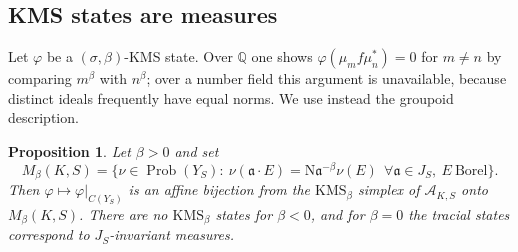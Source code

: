 \documentclass[11pt]{amsart}
\numberwithin{equation}{section}
\newtheorem{proposition}[theorem]{Proposition}
\theoremstyle{definition}
\theoremstyle{remark}
\newcommand{\Q}{\mathbb{Q}}
\newcommand{\Prob}{\operatorname{Prob}}
\newcommand{\Ns}{\mathrm{N}}
\newcommand{\cA}{\mathcal{A}}
\newcommand{\aaa}{\mathfrak{a}}
\begin{document}
\subsection{KMS states are measures}

Let $\varphi$ be a $(\sigma,\beta)$-KMS state. Over $\Q$ one shows
$\varphi(\mu_mf\mu_n^*)=0$ for $m\neq n$ by comparing $m^\beta$ with $n^\beta$;
over a number field this argument is unavailable, because distinct ideals
frequently have equal norms. We use instead the groupoid description.

\begin{proposition}\label{prop:kmsmeasures}
Let $\beta>0$ and set
\[
M_\beta(K,S)=\bigl\{\nu\in\Prob(Y_S):\ \nu(\aaa\cdot E)=\Ns\aaa^{-\beta}\nu(E)\ \ \forall\aaa\in J_S,\ E\ \text{Borel}\bigr\}.
\]
Then $\varphi\mapsto\varphi|_{C(Y_S)}$ is an affine bijection from the
$\mathrm{KMS}_\beta$ simplex of $\cA_{K,S}$ onto $M_\beta(K,S)$. There are no
$\mathrm{KMS}_\beta$ states for $\beta<0$, and for $\beta=0$ the tracial states
correspond to $J_S$-invariant measures.
\end{proposition}
\end{document}
